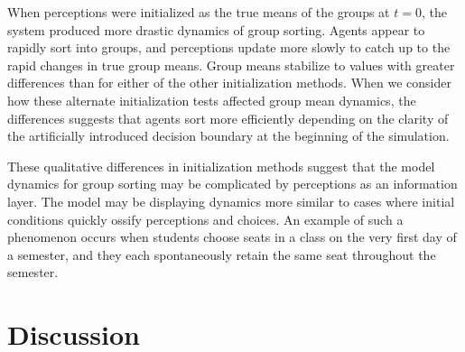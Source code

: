 
When perceptions were initialized as the true means of the groups at $t=0$, the system produced more drastic dynamics of group sorting. Agents appear to rapidly sort into groups, and perceptions update more slowly to catch up to the rapid changes in true group means. Group means stabilize to values with greater differences than for either of the other initialization methods. When we consider how these alternate initialization tests affected group mean dynamics, the differences suggests that agents sort more efficiently depending on the clarity of the artificially introduced decision boundary at the beginning of the simulation. 

These qualitative differences in initialization methods suggest that the model dynamics for group sorting may be complicated by perceptions as an information layer. The model may be displaying dynamics more similar to cases where initial conditions quickly ossify perceptions and choices. An example of such a phenomenon occurs when students choose seats in a class on the very first day of a semester, and they each spontaneously retain the same seat throughout the semester. 



\section{Discussion}

